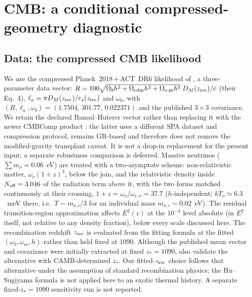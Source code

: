 \section{CMB: a conditional compressed-geometry diagnostic}\label{sec:cmb}

\subsection{Data: the compressed CMB likelihood}
We use the compressed Planck~2018\,+\,ACT~DR6 likelihood of \citet{Bansal2025}, a three-parameter data vector: $R=100\sqrt{\Omega_bh^2+\Omega_{\rm cdm}h^2+\Omega_{\nu,\rm m}h^2}\;D_M(z_{\rm rec})/c$ (their Eq.~4), $\ell_a=\pi D_M(z_{\rm rec})/r_s(z_{\rm rec})$ and $\omega_b$, with $(R,\ell_a,\omega_b)=(1.7504,\,301.77,\,0.022371)$ and the published $3\times3$ covariance. We retain the declared Bansal--Huterer vector rather than replacing it with the newer CMBComp product \citep{CMBComp2026}: the latter uses a different SPA dataset and compression protocol, remains GR-based and therefore does not remove the modified-gravity transplant caveat. It is not a drop-in replacement for the present input; a separate robustness comparison is deferred.
Massive neutrinos ($\sum m_\nu=0.06$~eV) are treated with a two-asymptote scheme: non-relativistic matter, $\omega_\nu(1+z)^3$, below the join, and the relativistic density inside $N_{\rm eff}=3.046$ of the radiation term above it, with the two forms matched continuously at their crossing, $1+z=\omega_\nu/\omega_{r,\nu}=37.7$ ($h$-independent; $kT_\nu\simeq6.3$~meV there, i.e.\ $T\sim m_{\nu,i}/3$ for an individual mass $m_{\nu,i}\sim0.02$~eV). The residual transition-region approximation affects $E^2(z)$ at the $10^{-4}$ level absolute (in $E^2$ itself, not relative to any density fraction), below every scale discussed here.
The recombination redshift $z_{\rm rec}$ is evaluated from the \citet{HuSugiyama1996} fitting formula at the fitted $(\omega_b,\omega_m,h)$ rather than held fixed at $1090$. Although the published mean vector and covariance were initially extracted at fixed $z_*=1090$, \citet[][Appendix~A]{Bansal2025} also validate the alternative with CAMB-determined $z_*$. Our fitted-$z_{\rm rec}$ choice follows that alternative under the assumption of standard recombination physics; the Hu--Sugiyama formula is not applied here to an exotic thermal history. A separate fixed-$z_*=1090$ sensitivity run is not reported.
